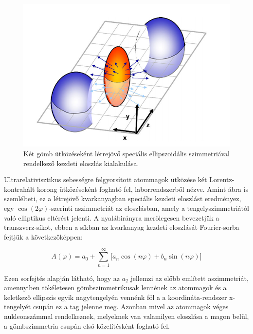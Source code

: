 \documentclass[10pt,a4paper]{article}
\numberwithin{equation}{subsection}
\numberwithin{figure}{section}
\begin{document}
\begin{center}
\begin{figure}[H]
\centering
\includegraphics[scale=0.6]{pic/int/p2}
\caption{Két gömb ütközéseként létrejövő speciális ellipszoidális szimmetriával rendelkező kezdeti eloszlás kialakulása.}
\label{fig:ellip}
\end{figure}
\end{center}



Ultrarelativisztikus sebességre felgyorsított atommagok ütközése két Lorentz-kontrahált korong ütközéseként fogható fel, laborrendszerből nézve. Amint  ábra is szemlélteti, ez a létrejövő kvarkanyagban speciális kezdeti eloszlást eredményez, egy $\cos(2\varphi)$-szerinti aszimmetriát az eloszlásban, amely a tengelyszimmetriától való elliptikus eltérést jelenti.
A nyalábirányra merőlegesen bevezetjük a transzverz-síkot, ebben a síkban az kvarkanyag kezdeti eloszlását Fourier-sorba fejtjük a következőképpen:
\begin{large}
\begin{equation}
A(\varphi)= a_0+\sum_{n=1}^{\infty}\Big[a_n \cos(n\varphi)+b_n \sin(n\varphi)\Big]
\label{eq:e2}
\end{equation}
\end{large}
Ezen sorfejtés alapján látható, hogy az $a_2$ jellemzi az előbb említett aszimmetriát, amennyiben tökéletesen gömbszimmetrikusak lennének az atommagok és a keletkező ellipszis egyik nagytengelyén vennénk föl a a koordináta-rendszer x-tengelyét csupán ez a tag jelenne meg. Azonban mivel az atommagok véges nukleonszámmal rendelkeznek, melyeknek van valamilyen eloszlása a magon belül, a gömbszimmetria csupán első közelítésként fogható fel.
\end{document}
